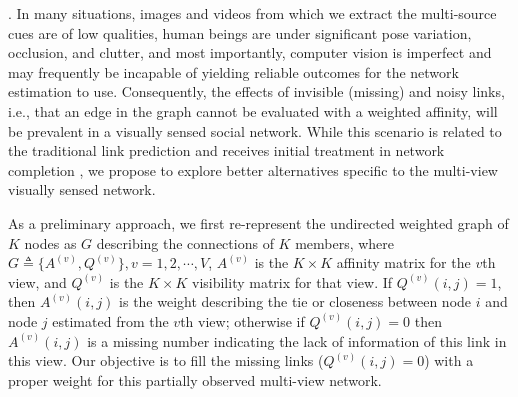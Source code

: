 \label{sec:reconstruct}

. In many situations, images and videos from which we extract the multi-source cues are of low qualities, human beings are under significant pose variation, occlusion, and clutter, and most importantly, computer vision is imperfect and may frequently be incapable of yielding reliable outcomes for the network estimation to use. Consequently, the effects of invisible (missing) and noisy links, i.e., that an edge in the graph cannot be evaluated with a weighted affinity, will be prevalent in a visually sensed social network. While this scenario is related to the traditional link prediction \cite{Goldberg,Liben-Nowell,TaskarWAK03} and receives initial treatment in network completion \cite{Clauset,Guimera,HannekeX09,KimL11}, we propose to explore better alternatives specific to the multi-view visually sensed network.

As a preliminary approach, we first re-represent the undirected weighted graph of $K$ nodes as $G$ describing the connections of $K$ members, where $G\triangleq\{A^{(v)}, Q^{(v)}\}, v=1,2,\cdots,V$, $A^{(v)}$ is the $K\times K$ affinity matrix for the $v$th view, and $Q^{(v)}$ is the $K\times K$ visibility matrix for that view. If $Q^{(v)}(i,j)=1$, then $A^{(v)}(i,j)$ is the weight describing the tie or closeness between node $i$ and node $j$ estimated from the $v$th view; otherwise if $Q^{(v)}(i,j)=0$ then $A^{(v)}(i,j)$ is a missing number indicating the lack of information of this link in this view. Our objective is to fill the missing links ($Q^{(v)}(i,j)=0$) with a proper weight for this partially observed multi-view network. 


